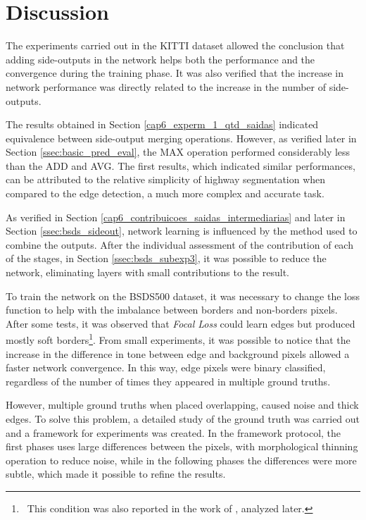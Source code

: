 \section{Discussion}
\label{cap6_discussion}

The experiments carried out in the KITTI dataset allowed the conclusion that adding side-outputs in the network helps both the performance and the convergence during the training phase.
It was also verified that the increase in network performance was directly related to the increase in the number of side-outputs.

The results obtained in Section \ref{cap6_experm_1_qtd_saidas} indicated equivalence between side-output merging operations.
However, as verified later in Section \ref{ssec:basic_pred_eval}, the MAX operation performed considerably less than the ADD and AVG.
The first results, which indicated similar performances, can be attributed to the relative simplicity of highway segmentation when compared to the edge detection, a much more complex and accurate task.

As verified in Section \ref{cap6_contribuicoes_saidas_intermediarias} and later in Section \ref{ssec:bsds_sideout}, network learning is influenced by the method used to combine the outputs.
After the individual assessment of the contribution of each of the stages, in Section \ref{ssec:bsds_subexp3}, it was possible to reduce the network, eliminating layers with small contributions to the result.

To train the network on the BSDS500 dataset, it was necessary to change the loss function to help with the imbalance between borders and non-borders pixels.
After some tests, it was observed that \textit{Focal Loss} could learn edges but produced mostly soft borders\footnote{~This condition was also reported in the work of \cite{WangDOOBNet:2018}, analyzed later.}.
From small experiments, it was possible to notice that the increase in the difference in tone between edge and background pixels allowed a faster network convergence.
In this way, edge pixels were binary classified, regardless of the number of times they appeared in multiple ground truths.

However, multiple ground truths when placed overlapping, caused noise and thick edges.
To solve this problem, a detailed study of the ground truth was carried out and a framework for experiments was created.
In the framework protocol, the first phases uses large differences between the pixels, with morphological thinning operation to reduce noise, while in the following phases the differences were more subtle, which made it possible to refine the results.

